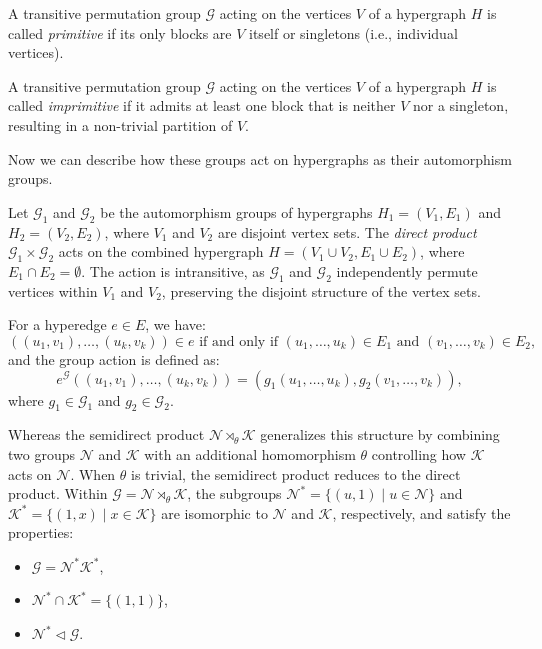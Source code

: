 \begin{definition}
A transitive permutation group $\mathcal{G}$ acting on the vertices $V$ of a hypergraph $H$ is called \emph{primitive} if its only blocks are $V$ itself or singletons (i.e., individual vertices).
\end{definition}

\begin{definition}
A transitive permutation group $\mathcal{G}$ acting on the vertices $V$ of a hypergraph $H$ is called \emph{imprimitive} if it admits at least one block that is neither $V$ nor a singleton, resulting in a non-trivial partition of $V$.
\end{definition}

Now we can describe how these groups act on hypergraphs as their automorphism groups.

Let $\mathcal{G}_1$ and $\mathcal{G}_2$ be the automorphism groups of hypergraphs $H_1=(V_1,E_1)$ and $H_2=(V_2,E_2)$, where $V_1$ and $V_2$ are disjoint vertex sets. The \emph{direct product} $\mathcal{G}_1\times\mathcal{G}_2$ acts on the combined hypergraph $H=(V_1\cup V_2,E_1\cup E_2)$, where $E_1\cap E_2=\emptyset$. The action is intransitive, as $\mathcal{G}_1$ and $\mathcal{G}_2$ independently permute vertices within $V_1$ and $V_2$, preserving the disjoint structure of the vertex sets.

For a hyperedge $e\in E$, we have:
\[
((u_1,v_1),\dots,(u_k,v_k))\in e\text{ if and only if }(u_1,\dots,u_k)\in E_1\text{ and }(v_1,\dots,v_k)\in E_2,
\]
and the group action is defined as:
\[
e^{\mathcal{G}}((u_1,v_1),\dots,(u_k,v_k))=(g_1(u_1,\dots,u_k),g_2(v_1,\dots,v_k)),
\]
where $g_1\in\mathcal{G}_1$ and $g_2\in\mathcal{G}_2$.

Whereas the semidirect product $\mathcal{N}\rtimes_\theta\mathcal{K}$ generalizes this structure by combining two groups $\mathcal{N}$ and $\mathcal{K}$ with an additional homomorphism $\theta$ controlling how $\mathcal{K}$ acts on $\mathcal{N}$. When $\theta$ is trivial, the semidirect product reduces to the direct product. Within $\mathcal{G}=\mathcal{N}\rtimes_\theta\mathcal{K}$, the subgroups $\mathcal{N}^*=\{(u,1)\mid u\in\mathcal{N}\}$ and $\mathcal{K}^*=\{(1,x)\mid x\in\mathcal{K}\}$ are isomorphic to $\mathcal{N}$ and $\mathcal{K}$, respectively, and satisfy the properties:
\begin{itemize}
\item $\mathcal{G}=\mathcal{N}^*\mathcal{K}^*$,
\item $\mathcal{N}^*\cap\mathcal{K}^*=\{(1,1)\}$,
\item $\mathcal{N}^*\lhd\mathcal{G}$.
\end{itemize}

